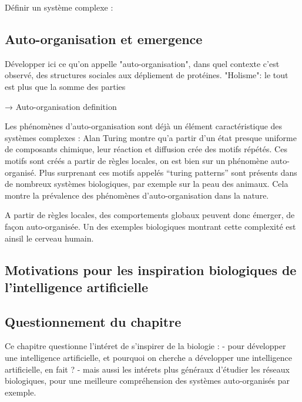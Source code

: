 Définir un système complexe : 

\subsection{Auto-organisation et emergence}

Développer ici ce qu'on appelle "auto-organisation", dans quel contexte c'est observé, des structures sociales aux dépliement de protéines. 
"Holisme": le tout est plus que la somme des parties

→ Auto-organisation definition

Les phénomènes d’auto-organisation sont déjà un élément caractéristique des systèmes complexes : Alan Turing montre qu’a partir d’un état presque uniforme de composants chimique, leur réaction et diffusion crée des motifs répétés. Ces motifs sont créés a partir de règles locales, on est bien sur un phénomène auto-organisé. Plus surprenant ces motifs appelés “turing patterns” sont présents dans de nombreux systèmes biologiques, par exemple sur la peau des animaux. Cela montre la prévalence des phénomènes d’auto-organisation dans la nature. 

A partir de règles locales, des comportements globaux peuvent donc émerger, de façon auto-organisée. Un des exemples biologiques montrant cette complexité est ainsil le cerveau humain. 

\subsection{Motivations pour les inspiration biologiques de l'intelligence artificielle}



\subsection{Questionnement du chapitre}

Ce chapitre questionne l'intéret de s'inspirer de la biologie : 
- pour développer une intelligence artificielle, et pourquoi on cherche a développer une intelligence artificielle, en fait ? 
- mais aussi les intérets plus généraux d'étudier les réseaux biologiques, pour une meilleure compréhension des systèmes auto-organisés par exemple. 


